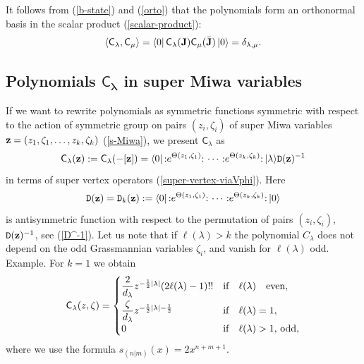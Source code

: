 \documentclass[pdftex]{sigma}
\numberwithin{equation}{section}
\newcommand{\C}{\textsf{C}_}
\renewcommand{\l}{\langle}
\renewcommand{\r}{\rangle}
\begin{document}
It follows from (\ref{b-state}) and (\ref{orto}) that
 the polynomials form an orthonormal basis in the scalar product
 (\ref{scalar-product}):
\[
\l  \textsf{C}_\lambda , \textsf{C}_\mu \r  = \l
0|\,\textsf{C}_\lambda({\bf J}) \textsf{C}_\mu({\bar{\bf
J}})\,|0\r = \delta_{\lambda,\mu}.
\]



\subsection[Polynomials  $\C\lambda$ in super Miwa variables]{Polynomials  $\boldsymbol{\C\lambda}$ in super Miwa variables}

If we want
to rewrite polynomials as symmetric functions symmetric with respect to the
action of symmetric group on pairs $(z_i,\zeta_i)$ of super Miwa
variables ${\bf z}=(z_1,\zeta_1,\dots ,z_k,\zeta_k)$
(\ref{s-Miwa}), we present $\C\lambda$ as
\[
\C\lambda({\bf z}) := \C\lambda(-[{\bf z}]) = \l
0|\,{:}e^{\Theta(z_1,\zeta_1)}{:}\, \cdots
\,{:}e^{\Theta(z_k,\zeta_k)}{:}\,|\lambda\r  \texttt{D}({\bf z})^{-1}
\]
in terms of super vertex operators (\ref{super-vertex-viaVphi}). Here
 \[
\texttt{D}({\bf z}) = \texttt{D}_k({\bf z}) := \l
0|\,{:}e^{\Theta(z_1,\zeta_1)}{:}\, \cdots
\,{:}e^{\Theta(z_k,\zeta_k)}{:}\,|0\r
 \]
is antisymmetric function with respect to the permutation
 of pairs $(z_i,\zeta_i)$, ${\texttt{D}}({\bf z})^{-1}$, see (\ref{D^-1}).
 Let us note that if $\ell(\lambda)>k$ the polynomial $C_\lambda$ does not
depend on the odd Grassmannian variables $\zeta_i$, and vanish for
$\ell(\lambda)$ odd.
Example. For $k=1$ we obtain
 \begin{gather}\label{C-z-zeta-k=1}
\C\lambda(z,\zeta)=
\begin{cases}
\dfrac 2{d_\lambda} z^{-\frac12|\lambda|}(2\ell(\lambda)-1)!!
&\mbox{if}\quad \ell(\lambda)\quad \mbox{even}, \vspace{1mm}\\
\dfrac{\zeta}{d_\lambda} z^{-\frac 12|\lambda|-\frac 12} &\mbox{if}\quad \ell(\lambda)=1,  \\
0&\mbox{if}\quad \ell(\lambda)>1,\, \mbox{odd},
 \end{cases}
 \end{gather}
 where we use the formula $s_{(n|m)}(x)=2x^{n+m+1}$.
\end{document}
